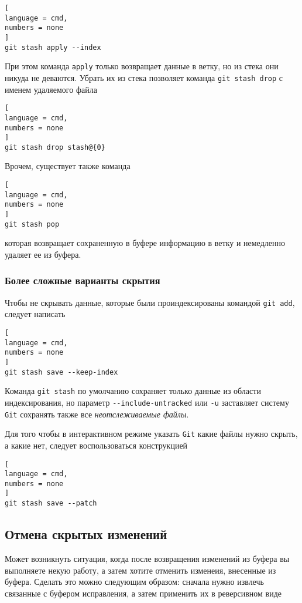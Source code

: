\documentclass[%
	11pt,
	a4paper,
	utf8,
		]{article}
\begin{document}
\begin{lstlisting}[
language = cmd,
numbers = none
]
git stash apply --index
\end{lstlisting}

При этом команда \texttt{apply} только возвращает данные в ветку, но из стека они никуда не деваются. Убрать их из стека позволяет команда \texttt{git stash drop} с именем удаляемого файла

\begin{lstlisting}[
language = cmd,
numbers = none
]
git stash drop stash@{0}
\end{lstlisting}


Врочем, существует также команда
\begin{lstlisting}[
language = cmd,
numbers = none
]
git stash pop
\end{lstlisting}
которая возвращает сохраненную в буфере информацию в ветку и немедленно удаляет ее из буфера.

\subsubsection{Более сложные варианты скрытия}

Чтобы не скрывать данные, которые были проиндексированы командой \texttt{git add}, следует написать

\begin{lstlisting}[
language = cmd,
numbers = none
]
git stash save --keep-index
\end{lstlisting}

Команда \texttt{git stash} по умолчанию сохраняет только данные из области индексирования, но параметр \lstinline{--include-untracked} или \lstinline{-u} заставляет систему \texttt{Git} сохранять также все \emph{неотслеживаемые файлы}.

Для того чтобы в интерактивном режиме указать \texttt{Git} какие файлы нужно скрыть, а какие нет, следует воспользоваться конструкцией

\begin{lstlisting}[
language = cmd,
numbers = none
]
git stash save --patch
\end{lstlisting}


\subsection{Отмена скрытых изменений}

Может возникнуть ситуация, когда после возвращения изменений из буфера вы выполняете некую работу, а затем хотите отменить изменеия, внесенные из буфера. Сделать это можно следующим образом: сначала нужно извлечь связанные с буфером исправления, а затем применить их в реверсивном виде
\end{document}

